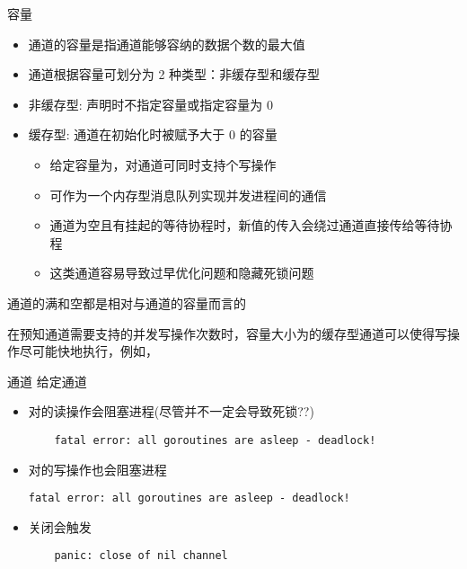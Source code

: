 \begin{frame}{容量}
    \begin{itemize}
        \item 通道的容量是指通道能够容纳的数据个数的最大值
        \item\pause 通道根据容量可划分为 2 种类型：\alert{非缓存型}和\alert{缓存型}
        \item 非缓存型: 声明时不指定容量或指定容量为 0
        \item 缓存型: 通道在初始化时被赋予大于 0 的容量
            \begin{itemize}
                \item 给定容量为，对通道可同时支持个写操作
                \item 可作为一个内存型消息队列实现并发进程间的通信
                \item 通道为空且有挂起的等待协程时，新值的传入会绕过通道直接传给等待协程
                \item 这类通道容易\alert{导致过早优化问题}和\alert{隐藏死锁问题}
            \end{itemize}
    \end{itemize}
    通道的\alert{满}和\alert{空}都是相对与通道的容量而言的 

    \pause\bigskip
    在预知通道需要支持的并发写操作次数时，容量大小为的缓存型通道可以使得写操作尽可能快地执行，例如，
\end{frame}

\begin{frame}[fragile]{通道}
    给定通道
    \begin{itemize}
        \item 对的读操作会阻塞进程(尽管并不一定会导致死锁??)
\begin{lstlisting}
    fatal error: all goroutines are asleep - deadlock!
\end{lstlisting}
        \item 对的写操作也会阻塞进程
\begin{lstlisting}
fatal error: all goroutines are asleep - deadlock!
\end{lstlisting}
        \item 关闭会触发
\begin{lstlisting}
    panic: close of nil channel 
\end{lstlisting}
    \end{itemize}
\end{frame}

